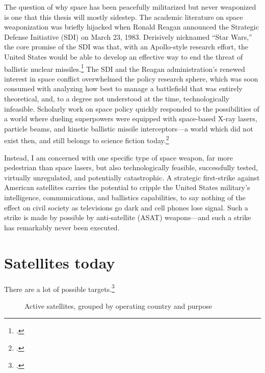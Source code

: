 \documentclass{report}
\begin{document}
The question of why space has been peacefully militarized but never weaponized is one that this thesis will mostly sidestep. The academic literature on space weaponization was briefly hijacked when Ronald Reagan announced the Strategic Defense Initiative (SDI) on March 23, 1983. Derisively nicknamed ``Star Wars,'' the core promise of the SDI was that, with an Apollo-style research effort, the United States would be able to develop an effective way to end the threat of ballistic nuclear missiles.\footcite{reagan_address_1983} The SDI and the Reagan administration's renewed interest in space conflict overwhelmed the policy research sphere, which was soon consumed with analyzing how best to manage a battlefield that was entirely theoretical, and, to a degree not understood at the time, technologically infeasible. Scholarly work on space policy quickly responded to the possibilities of a world where dueling superpowers were equipped with space-based X-ray lasers, particle beams, and kinetic ballistic missile interceptors---a world which did not exist then, and still belongs to science fiction today.\footcite[p.~1-2]{moorhead_work_2013}

Instead, I am concerned with one specific type of space weapon, far more pedestrian than space lasers, but also technologically feasible, successfully tested, virtually unregulated, and potentially catastrophic. A strategic first-strike against American satellites carries the potential to cripple the United States military's intelligence, communications, and ballistics capabilities, to say nothing of the effect on civil society as televisions go dark and cell phones lose signal. Such a strike is made by possible by anti-satellite (ASAT) weapons---and such a strike has remarkably never been executed.


\section{Satellites today}
There are a lot of possible targets.\footcite[A few satellites are listed as dual-purpose (i.e. Government/Military), and those are counted twice, once for each purpose. For instance, the data shows that the US is currently operating 830 satellites, while adding up the bars in this chart would give you 966. I made this choice to emphasize the dependency of various social systems on the existing satellite infrastructure.]{union_of_concerned_scientists_ucs_2018}


\begin{figure}[ht]
  \centering
  
  \label{country_sats}
  \caption{Active satellites, grouped by operating country and purpose}
\end{figure}

\newpage
\printbibliography[heading=subbibliography]
\end{document}
